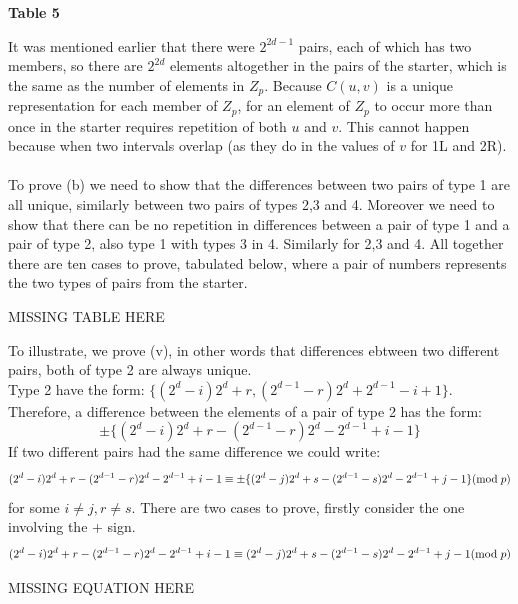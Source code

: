 \documentclass[
  12pt,
  a4paper]{book}
\begin{document}
\textbf{Table 5}

It was mentioned earlier that there were \(2^{2d-1}\) pairs, each of which
has two members, so there are \(2^{2d}\) elements altogether in the pairs
of the starter, which is the same as the number of elements in \(Z_p\).
Because \(C(u,v)\) is a unique representation for each member of \(Z_p\),
for an element of \(Z_p\) to occur more than once in the starter requires
repetition of both \(u\) and \(v\). This cannot happen because when two
intervals overlap (as they do in the values of \(v\) for 1L and 2R).\\
~\\
To prove (b) we need to show that the differences between two pairs of
type 1 are all unique, similarly between two pairs of types 2,3 and 4.
Moreover we need to show that there can be no repetition in differences
between a pair of type 1 and a pair of type 2, also type 1 with types 3
in 4. Similarly for 2,3 and 4. All together there are ten cases to
prove, tabulated below, where a pair of numbers represents the two types
of pairs from the starter.

MISSING TABLE HERE

To illustrate, we prove (v), in other words that differences ebtween two
different pairs, both of type 2 are always unique.\\
Type 2 have the form: \(\{(2^d-i)2^d+r, (2^{d-1}-r)2^d+2^{d-1}-i+1\}\).
Therefore, a difference between the elements of a pair of type 2 has the
form: \[\pm \{(2^d-i)2^d+r-(2^{d-1}-r)2^d-2^{d-1}+i-1\}\] If two
different pairs had the same difference we could write:
\[(2^d-i)2^d+r-(2^{d-1}-r)2^d-2^{d-1}+i-1
\equiv \pm \{(2^d-j)2^d +s-(2^{d-1}-s)2^d-2^{d-1}+j-1\}(\mathrm{mod} \hspace{0.1cm} p)\]
for some \(i \neq j, r \neq s\). There are two cases to prove, firstly
consider the one involving the + sign.
\[(2^d-i)2^d+r-(2^{d-1}-r)2^d-2^{d-1}+i-1 \equiv (2^d-j)2^d + s -(2^{d-1}-s)2^d - 2^{d-1} + j -1 (\mathrm{mod} \hspace{0.1cm} p)\]

MISSING EQUATION HERE
\end{document}
